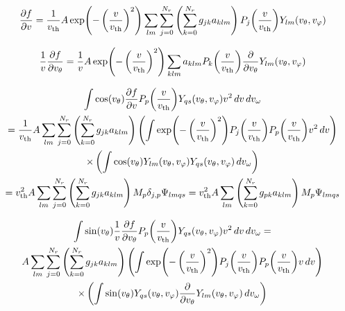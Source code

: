 \documentclass{article}
\begin{document}
\begin{align*}
\frac{\partial f}{\partial v}
=
\frac{1}{\vth}
A \exp\of{-\left(\frac{\vr}{\vth}\right)^2} 
\sum_{lm} \sum_{j=0}^{N_r} 
\left(\sum_{k=0}^{N_r} g_{jk} a_{klm} \right) 
P_j\of{\frac{\vr}{\vth}} Y_{lm}\of{\vtheta,\vphi}
\end{align*}

\begin{align*}
\frac{1}{\vr}\frac{\partial f}{\partial \vtheta}
=
\frac{1}{\vr} A \exp\of{-\left(\frac{\vr}{\vth}\right)^2} 
\sum_{klm} a_{klm} P_k\of{\frac{\vr}{\vth}} 
\frac{\partial}{\partial \vtheta} Y_{lm}\of{\vtheta,\vphi}
\end{align*}

\begin{multline*}
\myint \cos\of{\vtheta} \frac{\partial f}{\partial \vr} P_p\of{\frac{\vr}{\vth}} Y_{qs}\of{\vtheta,\vphi} \vr^2 \diff{\vr} \diff{\vomega}
\\
=
\frac{1}{\vth}
A \sum_{lm} \sum_{j=0}^{N_r} \left(\sum_{k=0}^{N_r} g_{jk} a_{klm} \right) 
\left(
\int 
\exp\of{-\left(\frac{\vr}{\vth}\right)^2} P_j\of{\frac{v}{\vth}} P_p\of{\frac{\vr}{\vth}} \vr^2 
\diff{v}
\right)
\\
\times
\left(
\int
\cos\of{\vtheta} 
Y_{lm}\of{\vtheta,\vphi}
Y_{qs}\of{\vtheta,\vphi}
\diff{\vomega}
\right)
\\
=
\vth^2
A \sum_{lm} \sum_{j=0}^{N_r} \left(\sum_{k=0}^{N_r} g_{jk} a_{klm} \right) 
M_{p} \delta_{j,p}
\Psi_{lmqs}
=
\vth^2
A \sum_{lm} \left(\sum_{k=0}^{N_r} g_{pk} a_{klm} \right) 
M_{p}
\Psi_{lmqs}
\end{multline*}

\begin{multline*}
\myint \sin\of{\vtheta} \frac{1}{\vr} \frac{\partial f}{\partial \vtheta} P_p\of{\frac{v}{\vth}} Y_{qs}\of{\vtheta,\vphi} \vr^2 \diff{\vr} \diff{\vomega}
=
\\
A \sum_{lm} \sum_{j=0}^{N_r} \left(\sum_{k=0}^{N_r} g_{jk} a_{klm} \right) 
\left(
\int 
\exp\of{-\left(\frac{\vr}{\vth}\right)^2} P_j\of{\frac{\vr}{\vth}} P_p\of{\frac{\vr}{\vth}} \vr
\diff{\vr}
\right)
\\
\times
\left(
\int
\sin\of{\vtheta} 
Y_{qs}\of{\vtheta,\vphi}
\frac{\partial}{\partial \vtheta}
Y_{lm}\of{\vtheta,\vphi}
\diff{\vomega}
\right)
\end{multline*}
\end{document}
